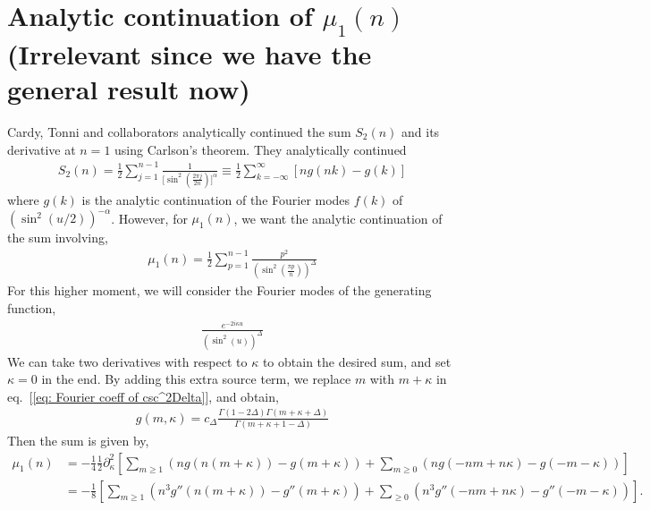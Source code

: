 \documentclass[11pt]{article}
\newcommand{\p}{\partial}
\newcommand{\nn}{\nonumber}
\newcommand{\lb}{\left(}
\newcommand{\rb}{\right)}
\begin{document}
\section{\texorpdfstring{Analytic continuation of $\mu_1(n)$ (Irrelevant since we have the general result now)}
{Analytic continuation of mu1(n)}}\label{Analytic continuation of mu1}
Cardy, Tonni and collaborators analytically continued the sum $S_2(n)$ and its derivative at $n=1$ using Carlson's theorem. They analytically continued 
\begin{align*}
    S_2(n) = \frac{1}{2}\sum_{j=1}^{n-1} \frac{1}{\big[\sin^2\lb \frac{2\pi j}{2n} \rb\big]^\alpha} \equiv \frac{1}{2}\sum_{k = -\infty}^{\infty}[ng(nk)-g(k)]
\end{align*}
where $g(k)$ is the analytic continuation of the Fourier modes $f(k)$ of $\lb\sin^2(u/2)\rb^{-\alpha}$. However, for $\mu_1(n)$, we want the analytic continuation of the sum involving,
\begin{align}
    \mu_1(n) = \frac{1}{2}\sum_{p=1}^{n-1}\frac{p^2}{\lb \sin^2\lb \frac{\pi p}{n}\rb \rb^\Delta}
\end{align}
For this higher moment, we will consider the Fourier modes of the generating function,
\begin{align}
    \frac{e^{-2i\kappa u }}{(\sin^2(u))^\Delta}
\end{align}
We can take two derivatives with respect to $\kappa$ to obtain the desired sum, and set $\kappa= 0$ in the end. 
By adding this extra source term, we replace $m$ with $m + \kappa$ in eq.~[\ref{eq: Fourier coeff of csc^2Delta}], and obtain,
\begin{align}
    g(m,\kappa) = c_\Delta \frac{\Gamma(1-2\Delta) \Gamma(m + \kappa + \Delta)}{\Gamma(m+\kappa + 1 - \Delta)}
\end{align}
Then the sum is given by,
\begin{align}
    \mu_1(n) &= -\frac{1}{4}\frac{1}{2}\p_\kappa^2 \left[ \sum_{m\geq 1} \lb ng(n(m+\kappa)) - g(m+\kappa) \rb+ \sum_{m\geq 0}\lb ng(-nm+n\kappa) - g(-m-\kappa) \rb \right] \nn \\
    & = -\frac{1}{8} \left[ \sum_{m\geq 1}\lb n^3 g''(n(m+\kappa)) - g''(m+\kappa) \rb +\sum_{\geq 0}\lb n^3g''(-nm+n\kappa) -g''(-m-\kappa) \rb  \right].
\end{align}
\end{document}
